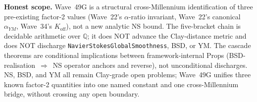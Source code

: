 \begin{remark}
\textbf{Honest scope.} Wave~49G is a structural cross-Millennium identification of three pre-existing factor-2 values (Wave~22's $\alpha$-ratio invariant, Wave~22's canonical $\alpha_{YM}$, Wave~34's $K_{\mathrm{off}}$), not a new analytic NS bound. The five-bracket chain is decidable arithmetic over $\mathbb{Q}$; it does NOT advance the Clay-distance metric and does NOT discharge \texttt{NavierStokesGlobalSmoothness}, BSD, or YM. The cascade theorems are conditional implications between framework-internal Props (BSD-realisation~$\Rightarrow$~NS operator anchors and reverse), not unconditional discharges. NS, BSD, and YM all remain Clay-grade open problems; Wave~49G unifies three known factor-2 quantities into one named constant and one cross-Millennium bridge, without crossing any open boundary.
\end{remark}

